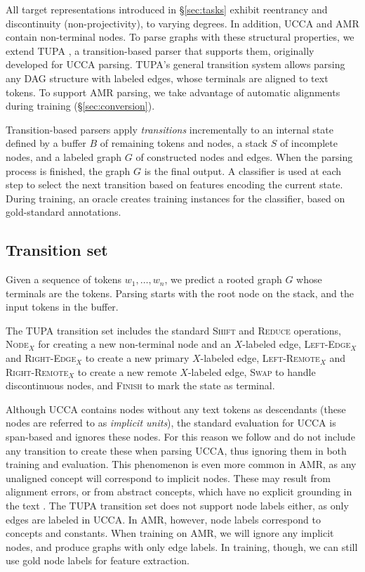 \documentclass[11pt,a4paper]{article}
\begin{document}
All target representations introduced in \S\ref{sec:tasks} exhibit
reentrancy and discontinuity (non-projectivity), to varying degrees.
In addition, UCCA and AMR contain non-terminal nodes.
To parse graphs with these structural properties,
we extend TUPA \cite{hershcovich2017a},
a transition-based parser that supports them,
originally developed for UCCA parsing.
TUPA's general transition system allows parsing any DAG structure with labeled edges,
whose terminals are aligned to text tokens.
To support AMR parsing, we take advantage of automatic alignments during training
(\S\ref{sec:conversion}).

Transition-based parsers \cite{Nivre03anefficient} apply \textit{transitions}
incrementally to an internal state defined by
a buffer $B$ of remaining tokens and nodes,
a stack $S$ of incomplete nodes,
and a labeled graph $G$ of constructed nodes and edges.
When the parsing process is finished, the graph $G$ is the final output.
A classifier is used at each step to select the next transition based on features
encoding the current state.
During training, an oracle creates training instances for the classifier,
based on gold-standard annotations.


\subsection{Transition set}\label{sec:transition_set}
Given a sequence of tokens $w_1, \ldots, w_n$,
we predict a rooted graph $G$ whose terminals are the tokens.
Parsing starts with the root node on the stack,
and the input tokens in the buffer.

The TUPA transition set includes
the standard \textsc{Shift} and \textsc{Reduce} operations,
\textsc{Node$_X$} for creating a new non-terminal node and an $X$-labeled edge,
\textsc{Left-Edge$_X$} and \textsc{Right-Edge$_X$} to create a new primary $X$-labeled edge,
\textsc{Left-Remote$_X$} and \textsc{Right-Remote$_X$} to create a new remote $X$-labeled edge,
\textsc{Swap} to handle discontinuous nodes,
and \textsc{Finish} to mark the state as terminal.

Although UCCA contains nodes without any text tokens as descendants
(these nodes are referred to as \textit{implicit units}),
the standard evaluation for UCCA \cite{abend2013universal} is span-based and
ignores these nodes.
For this reason we follow \citet{hershcovich2017a} and do not include
any transition to create these when parsing UCCA,
thus ignoring them in both training and evaluation.
This phenomenon is even more common in AMR, as any unaligned concept
will correspond to implicit nodes.
These may result from alignment errors,
or from abstract concepts,
which have no explicit grounding in the text \cite{buys2017oxford}.
The TUPA transition set does not support node labels either, as only edges are labeled in UCCA.
In AMR, however, node labels correspond to concepts and constants.
When training on AMR, we will ignore any implicit nodes, and produce graphs with only edge labels.
In training, though, we can still use gold node labels for feature extraction.
\end{document}
